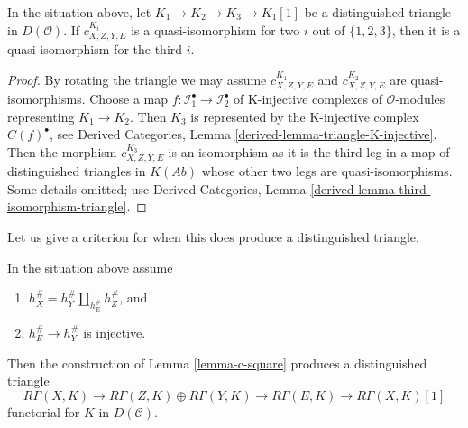 \begin{lemma}
\label{lemma-two-out-of-three-blow-up-square}
In the situation above, let $K_1 \to K_2 \to K_3 \to K_1[1]$ be a distinguished
triangle in $D(\mathcal{O})$.
If $c^{K_i}_{X, Z, Y, E}$ is a quasi-isomorphism for
two $i$ out of $\{1, 2, 3\}$, then it is a quasi-isomorphism
for the third $i$.
\end{lemma}

\begin{proof}
By rotating the triangle we may assume $c^{K_1}_{X, Z, Y, E}$ and
$c^{K_2}_{X, Z, Y, E}$ are quasi-isomorphisms. Choose a map
$f : \mathcal{I}^\bullet_1 \to \mathcal{I}^\bullet_2$ of
K-injective complexes of $\mathcal{O}$-modules representing $K_1 \to K_2$.
Then $K_3$ is represented by the K-injective complex
$C(f)^\bullet$, see
Derived Categories, Lemma \ref{derived-lemma-triangle-K-injective}.
Then the morphism $c^{K_3}_{X, Z, Y, E}$ is an isomorphism
as it is the third leg in a map of distinguished triangles
in $K(\textit{Ab})$ whose other two legs are quasi-isomorphisms.
Some details omitted; use
Derived Categories, Lemma \ref{derived-lemma-third-isomorphism-triangle}.
\end{proof}

\noindent
Let us give a criterion for when this does produce
a distinguished triangle.

\begin{lemma}
\label{lemma-square-triangle}
In the situation above assume
\begin{enumerate}
\item $h_X^\# = h_Y^\# \amalg_{h_E^\#} h_Z^\#$, and
\item $h_E^\# \to h_Y^\#$ is injective.
\end{enumerate}
Then the construction of Lemma \ref{lemma-c-square}
produces a distinguished triangle
$$
R\Gamma(X, K) \to
R\Gamma(Z, K) \oplus
R\Gamma(Y, K) \to
R\Gamma(E, K) \to R\Gamma(X, K)[1]
$$
functorial for $K$ in $D(\mathcal{C})$.
\end{lemma}


